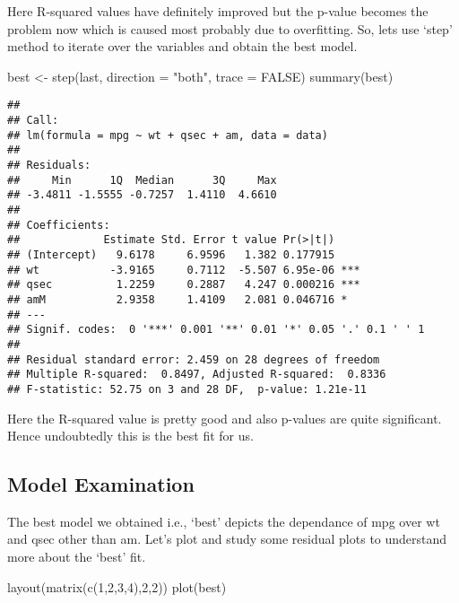 \documentclass[
]{article}
\newenvironment{Shaded}{\begin{snugshade}}{\end{snugshade}}
\newcommand{\AttributeTok}[1]{\textcolor[rgb]{0.77,0.63,0.00}{#1}}
\newcommand{\ConstantTok}[1]{\textcolor[rgb]{0.00,0.00,0.00}{#1}}
\newcommand{\DecValTok}[1]{\textcolor[rgb]{0.00,0.00,0.81}{#1}}
\newcommand{\FunctionTok}[1]{\textcolor[rgb]{0.00,0.00,0.00}{#1}}
\newcommand{\NormalTok}[1]{#1}
\newcommand{\OtherTok}[1]{\textcolor[rgb]{0.56,0.35,0.01}{#1}}
\newcommand{\StringTok}[1]{\textcolor[rgb]{0.31,0.60,0.02}{#1}}
\begin{document}
Here R-squared values have definitely improved but the p-value becomes
the problem now which is caused most probably due to overfitting. So,
lets use `step' method to iterate over the variables and obtain the best
model.

\begin{Shaded}
\begin{Highlighting}[]
\NormalTok{best }\OtherTok{\textless{}{-}} \FunctionTok{step}\NormalTok{(last, }\AttributeTok{direction =} \StringTok{"both"}\NormalTok{, }\AttributeTok{trace =} \ConstantTok{FALSE}\NormalTok{)}
\FunctionTok{summary}\NormalTok{(best)}
\end{Highlighting}
\end{Shaded}

\begin{verbatim}
## 
## Call:
## lm(formula = mpg ~ wt + qsec + am, data = data)
## 
## Residuals:
##     Min      1Q  Median      3Q     Max 
## -3.4811 -1.5555 -0.7257  1.4110  4.6610 
## 
## Coefficients:
##             Estimate Std. Error t value Pr(>|t|)    
## (Intercept)   9.6178     6.9596   1.382 0.177915    
## wt           -3.9165     0.7112  -5.507 6.95e-06 ***
## qsec          1.2259     0.2887   4.247 0.000216 ***
## amM           2.9358     1.4109   2.081 0.046716 *  
## ---
## Signif. codes:  0 '***' 0.001 '**' 0.01 '*' 0.05 '.' 0.1 ' ' 1
## 
## Residual standard error: 2.459 on 28 degrees of freedom
## Multiple R-squared:  0.8497, Adjusted R-squared:  0.8336 
## F-statistic: 52.75 on 3 and 28 DF,  p-value: 1.21e-11
\end{verbatim}

Here the R-squared value is pretty good and also p-values are quite
significant. Hence undoubtedly this is the best fit for us.

\hypertarget{model-examination}{%
\subsection{Model Examination}\label{model-examination}}

The best model we obtained i.e., `best' depicts the dependance of mpg
over wt and qsec other than am. Let's plot and study some residual plots
to understand more about the `best' fit.

\begin{Shaded}
\begin{Highlighting}[]
\FunctionTok{layout}\NormalTok{(}\FunctionTok{matrix}\NormalTok{(}\FunctionTok{c}\NormalTok{(}\DecValTok{1}\NormalTok{,}\DecValTok{2}\NormalTok{,}\DecValTok{3}\NormalTok{,}\DecValTok{4}\NormalTok{),}\DecValTok{2}\NormalTok{,}\DecValTok{2}\NormalTok{))}
\FunctionTok{plot}\NormalTok{(best)}
\end{Highlighting}
\end{Shaded}
\end{document}
